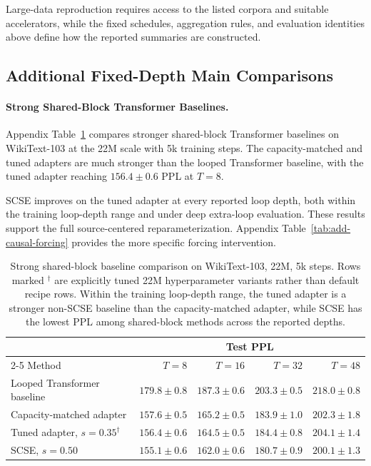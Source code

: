 \documentclass[letterpaper]{article} %
\newcommand{\SCSE}{\textsc{SCSE}}
\theoremstyle{remark}
\begin{document}
Large-data reproduction requires access to the listed corpora and suitable accelerators, while the fixed schedules, aggregation rules, and evaluation identities above define how the reported summaries are constructed.

\subsection{Additional Fixed-Depth Main Comparisons}
\label{app:fixed-depth-main-comparisons}
\paragraph{Strong Shared-Block Transformer Baselines.} Appendix Table~\ref{tab:strong_followup} compares stronger shared-block Transformer baselines on WikiText-103 at the 22M scale with 5k training steps.  The capacity-matched and tuned adapters are much stronger than the looped Transformer baseline, with the tuned adapter reaching $156.4\pm0.6$ PPL at $T=8$.

\SCSE{} improves on the tuned adapter at every reported loop depth, both within the training loop-depth range and under deep extra-loop evaluation.  These results support the full source-centered reparameterization.  Appendix Table~\ref{tab:add-causal-forcing} provides the more specific forcing intervention.

\begin{table}[t!]
	\centering
	\scriptsize
	\begin{tabular}{lrrrr}
		\toprule
		                                  & \multicolumn{4}{c}{Test PPL}                                                                            \\
		\cmidrule(lr){2-5}
		Method                            & $T=8$                        & $T=16$                 & $T=32$                 & $T=48$                 \\
		\midrule
		Looped Transformer baseline       & $179.8\pm0.8$                & $187.3\pm0.6$          & $203.3\pm0.5$          & $218.0\pm0.8$          \\
		Capacity-matched adapter          & $157.6\pm0.5$                & $165.2\pm0.5$          & $183.9\pm1.0$          & $202.3\pm1.8$          \\
		Tuned adapter, $s=0.35^{\dagger}$ & $156.4\pm0.6$                & $164.5\pm0.5$          & $184.4\pm0.8$          & $204.1\pm1.4$          \\
		\SCSE{}, $s=0.50$                 & $\mathbf{155.1\pm0.6}$       & $\mathbf{162.0\pm0.6}$ & $\mathbf{180.7\pm0.9}$ & $\mathbf{200.1\pm1.3}$ \\
		\bottomrule
	\end{tabular}
	\caption{Strong shared-block baseline comparison on WikiText-103, 22M, 5k steps.  Rows marked $^\dagger$ are explicitly tuned 22M hyperparameter variants rather than default recipe rows.  Within the training loop-depth range, the tuned adapter is a stronger non-\SCSE{} baseline than the capacity-matched adapter, while \SCSE{} has the lowest PPL among shared-block methods across the reported depths.}
	\label{tab:strong_followup}
\end{table}
\end{document}
